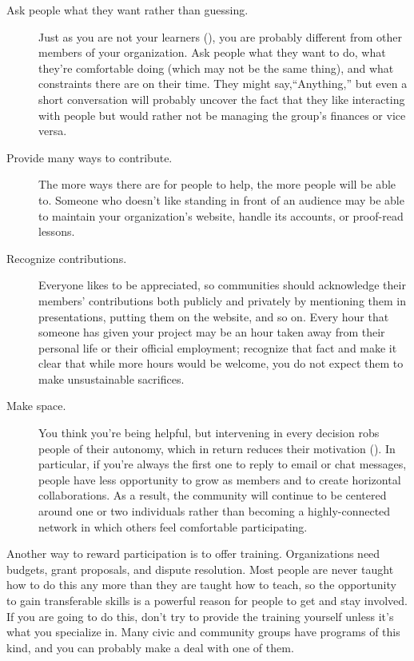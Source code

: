 \begin{description}

\item[Ask people what they want rather than guessing.]
  Just as you are not your learners (),
  you are probably different from other members of your organization.
  Ask people what they want to do,
  what they're comfortable doing (which may not be the same thing),
  and what constraints there are on their time.
  They might say,``Anything,''
  but even a short conversation will probably uncover the fact that
  they like interacting with people but would rather not be managing the group's finances
  or vice versa.

\item[Provide many ways to contribute.]
  The more ways there are for people to help,
  the more people will be able to.
  Someone who doesn't like standing in front of an audience
  may be able to maintain your organization's website,
  handle its accounts,
  or proof-read lessons.

\item[Recognize contributions.]
  Everyone likes to be appreciated,
  so communities should acknowledge
  their members' contributions both publicly and privately
  by mentioning them in presentations,
  putting them on the website,
  and so on.
  Every hour that someone has given your project
  may be an hour taken away from their personal life or their official employment;
  recognize that fact
  and make it clear that while more hours would be welcome,
  you do not expect them to make unsustainable sacrifices.

\item[Make space.]
  You think you're being helpful,
  but intervening in every decision robs people of their autonomy,
  which in return reduces their motivation ().
  In particular,
  if you're always the first one to reply to email or chat messages,
  people have less opportunity to grow as members
  and to create horizontal collaborations.
  As a result,
  the community will continue to be centered around one or two individuals
  rather than becoming a highly-connected network
  in which others feel comfortable participating.

\end{description}

Another way to reward participation is to offer training.
Organizations need budgets, grant proposals, and dispute resolution.
Most people are never taught how to do this any more than they are taught how to teach,
so the opportunity to gain transferable skills
is a powerful reason for people to get and stay involved.
If you are going to do this,
don't try to provide the training yourself
unless it's what you specialize in.
Many civic and community groups have programs of this kind,
and you can probably make a deal with one of them.

